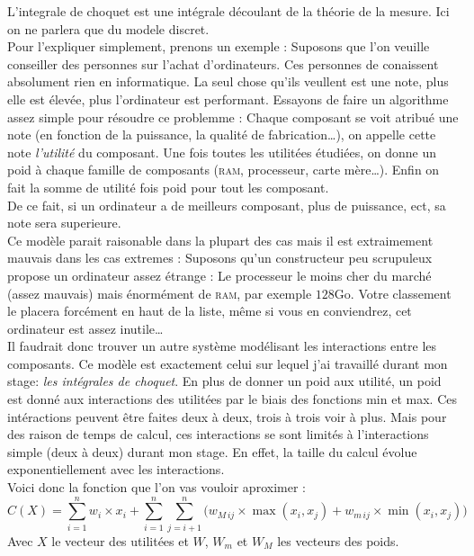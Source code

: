 
L'integrale de choquet est une intégrale découlant de la théorie de la mesure\cite{artch}.
Ici on ne parlera que du modele discret.\\


Pour l'expliquer simplement, prenons un exemple :
Suposons que l'on veuille conseiller des personnes sur l'achat d'ordinateurs.
Ces personnes de conaissent absolument rien en informatique.
La seul chose qu'ils veullent est une note, plus elle est élevée, plus l'ordinateur est performant.
Essayons de faire un algorithme assez simple pour résoudre ce problemme :
Chaque composant se voit atribué une note (en fonction de la puissance, la qualité de fabrication\ldots),
on appelle cette note \textit{l'utilité} du composant.
Une fois toutes les utilitées étudiées, on donne un poid à chaque famille de composants
(\textsc{ram}, processeur, carte mère\ldots).
Enfin on fait la somme de utilité fois poid pour tout les composant.\\
De ce fait, si un ordinateur a de meilleurs composant, plus de puissance, ect, sa note sera superieure.\\


Ce modèle parait raisonable dans la plupart des cas mais il est extraimement mauvais dans les cas extremes :
Suposons qu'un constructeur peu scrupuleux propose un ordinateur assez étrange :
Le processeur le moins cher du marché (assez mauvais) mais énormément de \textsc{ram}, par exemple $128$Go.
Votre classement le placera forcément en haut de la liste, même si vous en conviendrez,
cet ordinateur est assez inutile\ldots\\


Il faudrait donc trouver un autre système modélisant les interactions entre les composants.
Ce modèle est exactement celui sur lequel j'ai travaillé durant mon stage: \textit{les intégrales de choquet}.
En plus de donner un poid aux utilité,
un poid est donné aux interactions des utilitées par le biais des fonctions min et max.
Ces intéractions peuvent être faites deux à deux, trois à trois voir à plus.
Mais pour des raison de temps de calcul, ces interactions se sont limités à l'interactions simple
(deux à deux) durant mon stage.
En effet, la taille du calcul évolue exponentiellement avec les interactions.\\


Voici donc la fonction que l'on vas vouloir aproximer :
\begin{equation}
    \label{choquet}
    C(X)  =
    \sum_{i=1}^{n}
        w_i \times x_i +
    \sum_{i=1}^{n}\sum_{j=i+1}^{n}
    \Big(
        w_{M\,ij} \times \max(x_i,x_j) + w_{m\,ij} \times \min(x_i,x_j)
    \Big)
\end{equation}
Avec $X$ le vecteur des utilitées et $W$, $W_m$ et $W_M$ les vecteurs des poids.
